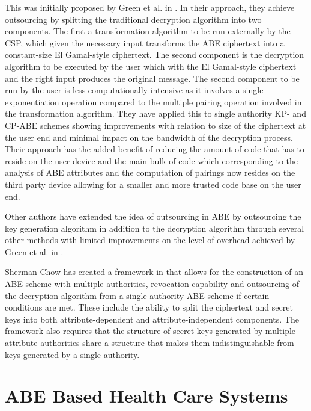 This was initially proposed by Green et al. in \cite{Green2011outsource}. In their approach, they achieve outsourcing by splitting the traditional decryption algorithm into two components. The first a transformation algorithm to be run externally by the CSP, which given the necessary input transforms the ABE ciphertext into a constant-size El Gamal-style ciphertext. The second component is the decryption algorithm to be executed by the user which with the El Gamal-style ciphertext and the right input produces the original message. The second component to be run by the user is less computationally intensive as it involves a single exponentiation operation compared to the multiple pairing operation involved in the transformation algorithm. They have applied this to single authority KP- and CP-ABE schemes showing improvements with relation to size of the ciphertext at the user end and  minimal impact on the bandwidth of the decryption process. Their approach has the added benefit of reducing the amount of code that has to reside on the user device and the main bulk of code which corresponding to the analysis of ABE attributes and the computation of pairings now resides on the third party device allowing for a smaller and more trusted code base on the user end.

Other authors \cite{Li2013outsource, Li2014outsource} have extended the idea of outsourcing in ABE by outsourcing the key generation algorithm in addition to the decryption algorithm through several other methods with limited improvements on the level of overhead achieved by Green et al. in \cite{Green2011outsource}.

Sherman Chow has created a framework in \cite{Chow2016outscourceframe} that allows for the construction of an ABE scheme with multiple authorities, revocation capability and outsourcing of the decryption algorithm from a single authority ABE scheme if certain conditions are met. These include the ability to split the ciphertext and secret keys into both attribute-dependent and attribute-independent components. The framework also requires that the structure of secret keys generated by multiple attribute authorities share a structure that makes them indistinguishable from keys generated by a single authority.



\section{ABE Based Health Care Systems}

